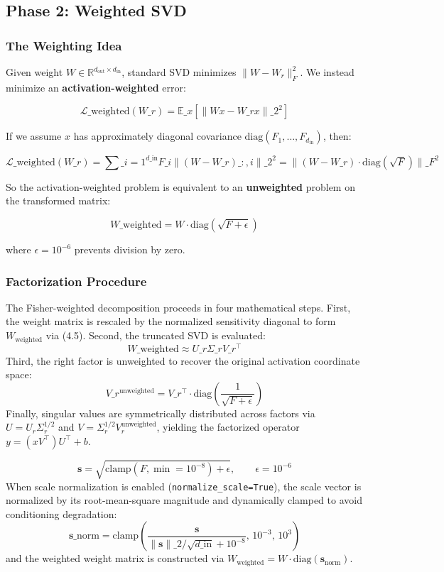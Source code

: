 \subsection{Phase 2: Weighted SVD}
\label{sec:fisher_weighted_svd}

\subsubsection{The Weighting Idea}

Given weight $W \in \mathbb{R}^{d_\text{out} \times d_\text{in}}$, standard 
SVD minimizes $\|W - W_r\|_F^2$. We instead minimize an \textbf{activation-weighted} 
error:

\[
\mathcal{L}\_\text{weighted}(W\_r) = \mathbb{E}\_x\!\left[\|W x - W\_r x\|\_2^2\right]
\tag{4.3}
\]

If we assume $x$ has approximately diagonal covariance 
$\mathrm{diag}(F_1, \dots, F_{d_\text{in}})$, then:

\[
\mathcal{L}\_\text{weighted}(W\_r) = \sum\_{i=1}^{d\_\text{in}} F\_i \|(W - W\_r)\_{:, i}\|\_2^2 = \|(W - W\_r) \cdot \mathrm{diag}(\sqrt{F})\|\_F^2
\tag{4.4}
\]

So the activation-weighted problem is equivalent to an \textbf{unweighted} problem 
on the transformed matrix:

\[
W\_\text{weighted} = W \cdot \mathrm{diag}(\sqrt{F + \epsilon})
\tag{4.5}
\]

where $\epsilon = 10^{-6}$ prevents division by zero.

\subsubsection{Factorization Procedure}

The Fisher-weighted decomposition proceeds in four mathematical steps. First, the weight matrix is rescaled by the normalized sensitivity diagonal to form $W_\text{weighted}$ via (4.5). Second, the truncated SVD is evaluated:
\[
W\_\text{weighted} \approx U\_r \Sigma\_r V\_r^\top
\tag{4.6}
\]
Third, the right factor is unweighted to recover the original activation coordinate space:
\[
V\_r^\text{unweighted} = V\_r^\top \cdot \mathrm{diag}\left(\frac{1}{\sqrt{F + \epsilon}}\right)
\tag{4.7}
\]
Finally, singular values are symmetrically distributed across factors via $U = U_r \Sigma_r^{1/2}$ and $V = \Sigma_r^{1/2} V_r^\text{unweighted}$, yielding the factorized operator $y = (x V^\top) U^\top + b$.

\[
\mathbf{s} = \sqrt{\mathrm{clamp}(F, \min=10^{-8}) + \epsilon}, \qquad \epsilon = 10^{-6}
\tag{4.8}
\]
When scale normalization is enabled (\texttt{normalize\_scale=True}), the scale vector is normalized by its root-mean-square magnitude and dynamically clamped to avoid conditioning degradation:
\[
\mathbf{s}\_{\mathrm{norm}} = \mathrm{clamp}\!\left(\frac{\mathbf{s}}{\|\mathbf{s}\|\_2 / \sqrt{d\_{\mathrm{in}}} + 10^{-8}},\, 10^{-3},\, 10^{3}\right)
\tag{4.9}
\]
and the weighted weight matrix is constructed via $W_{\mathrm{weighted}} = W \cdot \mathrm{diag}(\mathbf{s}_{\mathrm{norm}})$.

